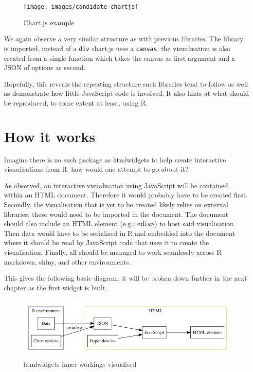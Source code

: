 \documentclass[10pt,]{krantz}
\begin{document}
\begin{figure}[H]

{\centering \texttt{[image: images/candidate-chartjs]} 

}

\caption{Chart.js example}\label{fig:candidate-chartjs}
\end{figure}

We again observe a very similar structure as with previous libraries. The library is imported, instead of a \texttt{div} chart.js uses a \texttt{canvas}, the visualisation is also created from a single function which takes the canvas as first argument and a JSON of options as second.

Hopefully, this reveals the repeating structure such libraries tend to follow as well as demonstrate how little JavaScript code is involved. It also hints at what should be reproduced, to some extent at least, using R.

\hypertarget{widgets-basics-inner-workings}{%
\section{How it works}\label{widgets-basics-inner-workings}}

Imagine there is no such package as htmlwidgets to help create interactive visualisations from R: how would one attempt to go about it?

As observed, an interactive visualisation using JavaScript will be contained within an HTML document. Therefore it would probably have to be created first. Secondly, the visualisation that is yet to be created likely relies on external libraries; these would need to be imported in the document. The document should also include an HTML element (e.g.: \texttt{\textless{}div\textgreater{}}) to host said visualisation. Then data would have to be serialised in R and embedded into the document where it should be read by JavaScript code that uses it to create the visualisation. Finally, all should be managed to work seamlessly across R markdown, shiny, and other environments.

This gives the following basic diagram; it will be broken down further in the next chapter as the first widget is built.

\begin{figure}[H]

{\centering \includegraphics[width=1\linewidth]{images/03-htmlwidget-viz} 

}

\caption{htmlwidgets inner-workings visualised}\label{fig:widget-inner-diagram}
\end{figure}
\end{document}
